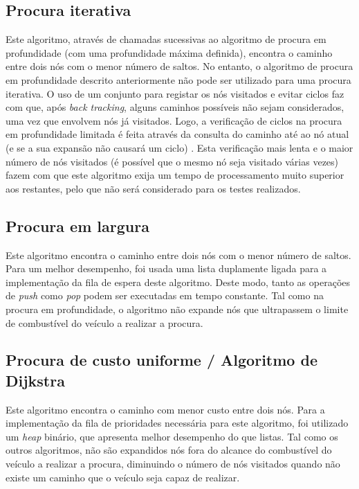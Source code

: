 \documentclass[12pt, a4paper, titlepage]{article}
\begin{document}
\subsection{Procura iterativa}

Este algoritmo, através de chamadas sucessivas ao algoritmo de procura em profundidade (com uma
profundidade máxima definida), encontra o caminho entre dois nós com o menor número de saltos. No
entanto, o algoritmo de procura em profundidade descrito anteriormente não pode ser utilizado para
uma procura iterativa. O uso de um conjunto para registar os nós visitados e evitar ciclos faz com
que, após \emph{back tracking}, alguns caminhos possíveis não sejam considerados, uma vez que
envolvem nós já visitados. Logo, a verificação de ciclos na procura em profundidade limitada é feita
através da consulta do caminho até ao nó atual (e se a sua expansão não causará um ciclo)
\cite{aima}. Esta verificação mais lenta e o maior número de nós visitados (é possível que o mesmo
nó seja visitado várias vezes) fazem com que este algoritmo exija um tempo de processamento muito
superior aos restantes, pelo que não será considerado para os testes realizados.

\subsection{Procura em largura}

Este algoritmo encontra o caminho entre dois nós com o menor número de saltos. Para um melhor
desempenho, foi usada uma lista duplamente ligada para a implementação da fila de espera deste
algoritmo. Deste modo, tanto as operações de \emph{push} como \emph{pop} podem ser executadas em
tempo constante. Tal como na procura em profundidade, o algoritmo não expande nós que ultrapassem o
limite de combustível do veículo a realizar a procura.

\subsection{Procura de custo uniforme / Algoritmo de Dijkstra}

Este algoritmo encontra o caminho com menor custo entre dois nós. Para a implementação da fila de
prioridades necessária para este algoritmo, foi utilizado um \emph{heap} binário, que apresenta
melhor desempenho do que listas. Tal como os outros algoritmos, não são expandidos nós fora do
alcance do combustível do veículo a realizar a procura, diminuindo o número de nós visitados quando
não existe um caminho que o veículo seja capaz de realizar.
\end{document}
